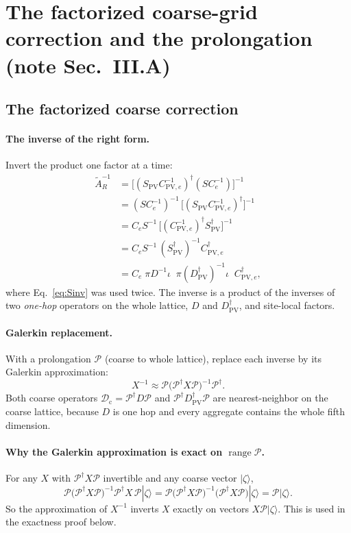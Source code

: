 \documentclass[11pt,a4paper]{article}
\numberwithin{equation}{section}
\newcommand{\dg}{^{\dagger}}
\newcommand{\Dpv}{D_{\mathrm{PV}}}
\newcommand{\Spv}{S_{\mathrm{PV}}}
\newcommand{\AR}{\tilde A_{R}}
\newcommand{\Pro}{\mathcal P}
\newcommand{\Dc}{\mathcal D_{\mathrm c}}
\newcommand{\Ce}{C_{e}}
\newcommand{\Cpve}{C_{\mathrm{PV},e}}
\begin{document}
\section{The factorized coarse-grid correction and the prolongation (note Sec.~III.A)}

\subsection{The factorized coarse correction}
\label{sec:factor}
\paragraph{The inverse of the right form.} Invert the product one factor at a time:
\begin{align}
\AR^{-1}&=\big[(\Spv\Cpve^{-1})\dg(S\Ce^{-1})\big]^{-1}\nonumber\\
&=(S\Ce^{-1})^{-1}\,\big[(\Spv\Cpve^{-1})\dg\big]^{-1}\nonumber\\
&=\Ce S^{-1}\,\big[(\Cpve^{-1})\dg\Spv\dg\big]^{-1}\nonumber\\
&=\Ce S^{-1}\,(\Spv\dg)^{-1}\Cpve\dg\nonumber\\
&=\Ce\;\pi D^{-1}\iota\;\;\pi(\Dpv\dg)^{-1}\iota\;\;\Cpve\dg ,
\label{eq:ARinv}
\end{align}
where Eq.~\eqref{eq:Sinv} was used twice. The inverse is a product of the inverses of two
\emph{one-hop} operators on the whole lattice, $D$ and $\Dpv\dg$, and site-local factors.

\paragraph{Galerkin replacement.} With a prolongation $\Pro$ (coarse to whole lattice), replace
each inverse by its Galerkin approximation:
\begin{equation}
X^{-1}\approx\Pro\big(\Pro\dg X\Pro\big)^{-1}\Pro\dg .
\end{equation}
Both coarse operators $\Dc=\Pro\dg D\Pro$ and $\Pro\dg\Dpv\dg\Pro$ are nearest-neighbor on the
coarse lattice, because $D$ is one hop and every aggregate contains the whole fifth dimension.

\paragraph{Why the Galerkin approximation is exact on $\operatorname{range}\Pro$.} For any $X$
with $\Pro\dg X\Pro$ invertible and any coarse vector $|\zeta\rangle$,
\begin{equation}
\Pro\big(\Pro\dg X\Pro\big)^{-1}\Pro\dg X\,\Pro|\zeta\rangle=\Pro\big(\Pro\dg X\Pro\big)^{-1}\big(\Pro\dg X\Pro\big)|\zeta\rangle=\Pro|\zeta\rangle .
\end{equation}
So the approximation of $X^{-1}$ inverts $X$ exactly on vectors $X\Pro|\zeta\rangle$. This is used in the
exactness proof below.
\end{document}
